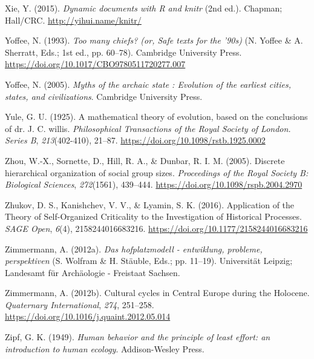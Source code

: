 \documentclass[
  12pt,
]{book}
\newlength{\cslhangindent}
\newlength{\cslentryspacingunit} %
\newenvironment{CSLReferences}[2] %
 {%
  \setlength{\parindent}{0pt}
  \ifodd #1
  \let\oldpar\par
  \def\par{\hangindent=\cslhangindent\oldpar}
  \fi
  \setlength{\parskip}{#2\cslentryspacingunit}
 }%
 {}
\begin{document}
\begin{CSLReferences}{1}{0}
\leavevmode{}%
Xie, Y. (2015). \emph{Dynamic documents with {R} and knitr} (2nd ed.). Chapman; Hall/CRC. \url{http://yihui.name/knitr/}

\leavevmode{}%
Yoffee, N. (1993). \emph{Too many chiefs? (or, Safe texts for the '90s)} (N. Yoffee \& A. Sherratt, Eds.; 1st ed., pp. 60--78). Cambridge University Press. \url{https://doi.org/10.1017/CBO9780511720277.007}

\leavevmode{}%
Yoffee, N. (2005). \emph{Myths of the archaic state : Evolution of the earliest cities, states, and civilizations}. Cambridge University Press.

\leavevmode{}%
Yule, G. U. (1925). A mathematical theory of evolution, based on the conclusions of dr. J. C. willis. \emph{Philosophical Transactions of the Royal Society of London. Series B}, \emph{213}(402-410), 21--87. \url{https://doi.org/10.1098/rstb.1925.0002}

\leavevmode{}%
Zhou, W.-X., Sornette, D., Hill, R. A., \& Dunbar, R. I. M. (2005). Discrete hierarchical organization of social group sizes. \emph{Proceedings of the Royal Society B: Biological Sciences}, \emph{272}(1561), 439--444. \url{https://doi.org/10.1098/rspb.2004.2970}

\leavevmode{}%
Zhukov, D. S., Kanishchev, V. V., \& Lyamin, S. K. (2016). Application of the {Theory} of {Self-Organized Criticality} to the {Investigation} of {Historical Processes}. \emph{SAGE Open}, \emph{6}(4), 2158244016683216. \url{https://doi.org/10.1177/2158244016683216}

\leavevmode{}%
Zimmermann, A. (2012a). \emph{Das hofplatzmodell - entwiklung, probleme, perspektiven} (S. Wolfram \& H. Stäuble, Eds.; pp. 11--19). Universität Leipzig; Landesamt für Archäologie - Freistaat Sachsen.

\leavevmode{}%
Zimmermann, A. (2012b). Cultural cycles in {Central Europe} during the {Holocene}. \emph{Quaternary International}, \emph{274}, 251--258. \url{https://doi.org/10.1016/j.quaint.2012.05.014}

\leavevmode{}%
Zipf, G. K. (1949). \emph{Human behavior and the principle of least effort: an introduction to human ecology}. Addison-Wesley Press.

\end{CSLReferences}
\end{document}
